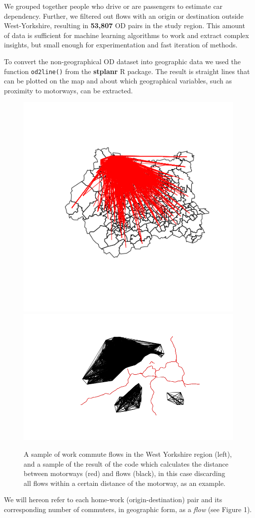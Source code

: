 \documentclass[]{article}
\begin{document}
We grouped together people who drive or are passengers to estimate car
dependency. Further, we filtered out flows with an origin or destination
outside West-Yorkshire, resulting in \textbf{53,807} OD pairs in the
study region. This amount of data is sufficient for machine learning
algorithms to work and extract complex insights, but small enough for
experimentation and fast iteration of methods.

To convert the non-geographical OD dataset into geographic data we used
the function \texttt{od2line()} from the \textbf{stplanr} R package. The
result is straight lines that can be plotted on the map and about which
geographical variables, such as proximity to motorways, can be
extracted.

\begin{figure}
\includegraphics[width=0.49\linewidth]{../figures/flows_500_westyorkshire} \includegraphics[width=0.49\linewidth]{../figures/dist_motorways} \caption{A sample of work commute flows in the West Yorkshire region (left), and a sample of the result of the code which calculates the distance between motorways (red) and flows (black), in this case discarding all flows within a certain distance of the motorway, as an example.}\label{fig:unnamed-chunk-2}
\end{figure}

We will hereon refer to each home-work (origin-destination) pair and its
corresponding number of commuters, in geographic form, as a \emph{flow}
(see Figure 1).
\end{document}
